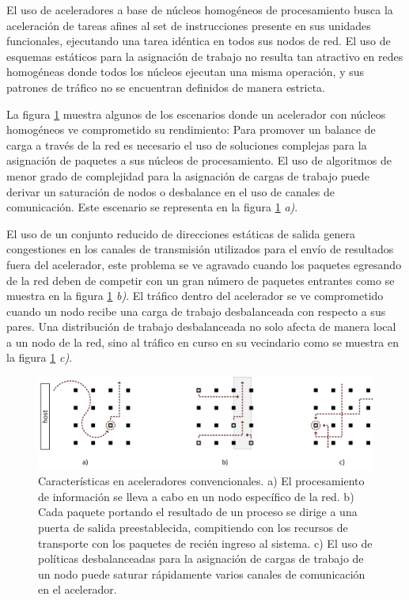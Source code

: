 El uso de aceleradores a base de núcleos homogéneos de procesamiento busca la aceleración de tareas afines al set de instrucciones presente en sus unidades funcionales, ejecutando una tarea idéntica en todos sus nodos de red. El uso de esquemas estáticos para la asignación de trabajo no resulta tan atractivo en redes homogéneas donde todos los núcleos ejecutan una misma operación, y sus patrones de tráfico no se encuentran definidos de manera estricta. 

La figura \ref{fig:ch5_tradicional_net} muestra algunos de los escenarios donde un acelerador con núcleos homogéneos ve comprometido su rendimiento: Para promover un balance de carga a través de la red es necesario el uso de soluciones complejas para la asignación de paquetes a sus núcleos de procesamiento. El uso de algoritmos de menor grado de complejidad para la asignación de cargas de trabajo puede derivar un saturación de nodos o desbalance en el uso de canales de comunicación. Este escenario se representa en la figura \ref{fig:ch5_tradicional_net} \textit{a)}. 

El uso de un conjunto reducido de direcciones estáticas de salida genera congestiones en los canales de transmisión utilizados para el envío de resultados fuera del acelerador, este problema se ve agravado cuando los paquetes egresando de la red deben de competir con un gran número de paquetes entrantes como se muestra en la figura \ref{fig:ch5_tradicional_net} \textit{b)}. El tráfico dentro del acelerador se ve comprometido cuando un nodo recibe una carga de trabajo desbalanceada con respecto a sus pares. Una distribución de trabajo desbalanceada no solo afecta de manera local a un nodo de la red, sino al tráfico en curso en su vecindario como se muestra en la figura \ref{fig:ch5_tradicional_net} \textit{c)}.

\begin{figure}
	\begin{center}
		\includegraphics[scale=0.7]{figures/ch5_tradicional_net.png}
	\end{center}
	\caption
		{	
			Características en aceleradores convencionales. a) El procesamiento de información se lleva a cabo en un nodo específico de la red. b) Cada paquete portando el resultado de un proceso se dirige a una puerta de salida preestablecida, compitiendo con los recursos de transporte con los paquetes de recién ingreso al sistema. c) El uso de políticas desbalanceadas para la asignación de cargas de trabajo de un nodo puede saturar rápidamente varios canales de comunicación en el acelerador.
		}
	\label{fig:ch5_tradicional_net}
\end{figure}


